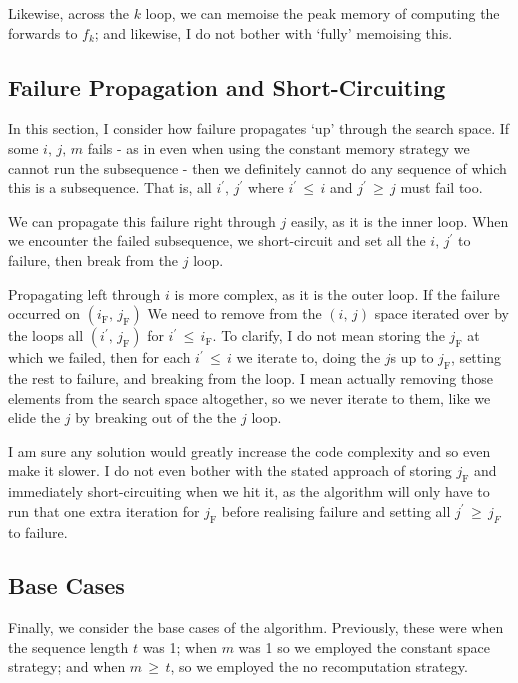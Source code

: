 Likewise, across the \(k\) loop, we can memoise the peak memory of computing the forwards to \(f_k\); and likewise, I do not bother with `fully' memoising this.

\subsection{Failure Propagation and Short-Circuiting}
In this section, I consider how failure propagates `up' through the search space.
If some \(i,\,j,\,m\) fails - as in even when using the constant memory strategy we cannot run the subsequence - then we definitely cannot do any sequence of which this is a subsequence.
That is, all \(i^\prime,\, j^\prime\) where \(i^\prime \,\leq\, i\) and \(j^\prime \,\geq\, j\) must fail too.

We can propagate this failure right through \(j\) easily, as it is the inner loop.
When we encounter the failed subsequence, we short-circuit and set all the \(i,\, j^\prime\) to failure, then break from the \(j\) loop.

Propagating left through \(i\) is more complex, as it is the outer loop.
If the failure occurred on \((i_\mathrm{F},\, j_\mathrm{F})\) We need to remove from the \((i,\,j)\) space iterated over by the loops all \((i^\prime,\, j_{\mathrm{F}})\) for \(i^\prime \,\leq\, i_\mathrm{F}\).
To clarify, I do not mean storing the \(j_\mathrm{F}\) at which we failed, then for each \(i^\prime \,\leq\, i\) we iterate to, doing the \(j\)s up to \(j_\mathrm{F}\), setting the rest to failure, and breaking from the loop.
I mean actually removing those elements from the search space altogether, so we never iterate to them, like we elide the \(j\) by breaking out of the the \(j\) loop.

I am sure any solution would greatly increase the code complexity and so even make it slower.
I do not even bother with the stated approach of storing \(j_\mathrm{F}\) and immediately short-circuiting when we hit it, as the algorithm will only have to run that one extra iteration for \(j_\mathrm{F}\) before realising failure and setting all \(j^\prime \,\geq\, j_{F}\) to failure.

\subsection{Base Cases}
Finally, we consider the base cases of the algorithm.
Previously, these were when the sequence length \(t\) was 1;
when \(m\) was 1 so we employed the constant space strategy;
and when \(m \,\geq\, t\), so we employed the no recomputation strategy.

